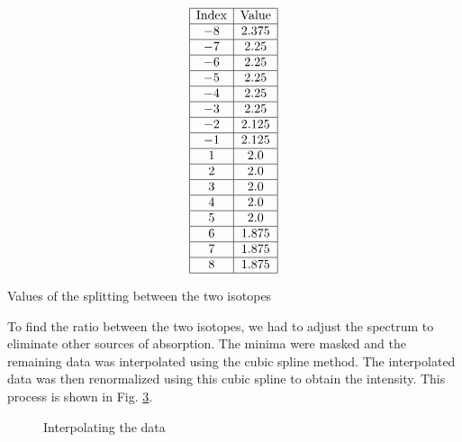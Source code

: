 \documentclass{article}
\begin{document}
\begin{table}[H]
    \centering
    \[
    \begin{array}{|c|c|}
    \hline \text{Index} & \text{Value} \\
    \hline -8 & 2.375 \\
    \hline -7 & 2.25 \\
    \hline -6 & 2.25 \\
    \hline -5 & 2.25 \\
    \hline -4 & 2.25 \\
    \hline -3 & 2.25 \\
    \hline -2 & 2.125 \\
    \hline -1 & 2.125 \\
    \hline 1 & 2.0 \\
    \hline 2 & 2.0 \\
    \hline 3 & 2.0 \\
    \hline 4 & 2.0 \\
    \hline 5 & 2.0 \\
    \hline 6 & 1.875 \\
    \hline 7 & 1.875 \\
    \hline 8 & 1.875 \\
    \hline
    \end{array}
    \]
    \caption{Values of the splitting between the two isotopes}
    \label{table:splitting_values}
\end{table}

To find the ratio between the two isotopes, we had to adjust the spectrum to eliminate other sources of absorption. The minima were masked and the remaining data was interpolated using the cubic spline method. The interpolated data was then renormalized using this cubic spline to obtain the intensity. This process is shown in Fig. \ref{fig:Interpolation}.

\begin{figure}[H]
	\centering
	\begin{subfigure}{0.45\textwidth}
		\centering
		\scalebox{0.50}{}
		\label{fig:original_interpolated_data_p_branch}
	\end{subfigure}
	\hspace{0.5cm}
	\begin{subfigure}{0.45\textwidth}
		\centering
		\scalebox{0.50}{}
		\label{fig:intensity_p_branch}
	\end{subfigure}
	\caption{Interpolating the data}
	\label{fig:Interpolation}
\end{figure}
\end{document}
